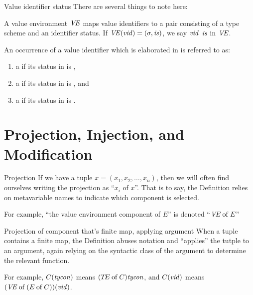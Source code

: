 \begin{definition}{Value identifier status}
There are several things to note here:

A value environment $\textit{V\kern-.05emE\/}$ maps value identifiers to a pair
consisting of a type scheme and an identifier status.
If $\textit{V\kern-.05emE\/}(\textit{vid\/})=(\sigma,\textit{is\/})$, we say $\textit{vid\/}$ 
$\textit{is\/}$ in $\textit{V\kern-.05emE\/}$.

An occurrence of a value identifier which is elaborated in \VE{} is
referred to as:
\begin{enumerate}
\item a  if its status in \VE{} is \isv,
\item a  if its status in \VE{} is \isc, and
\item a  if its status in \VE{} is \ise.
\end{enumerate}
\end{definition}

\section{Projection, Injection, and Modification}

\begin{definition}{Projection}
If we have a tuple $x=(x_{1},x_{2},\dots,x_{n})$, then we will often
find ourselves writing the projection as ``$x_{i}$ of $x$''. That is to
say, the Definition relies on metavariable names to indicate which
component is selected.

For example, ``the value environment component of $E$'' is denoted
``$\textit{V\kern-.05emE\/} \mathbin{\rm of} E$''
\end{definition}

\begin{convention}{Projection of component that's finite map, applying argument}
When a tuple contains a finite map, the Definition abuses notation and
``applies'' the tutple to an argument, again relying on the syntactic
class of the argument to determine the relevant function.

For example, $C(\textit{tycon\/})$ means $(\mbox{$T\!E$} \mathbin{\rm of} C)\textit{tycon\/}$,
and $C(\textit{vid\/})$ means $(\textit{V\kern-.05emE\/} \mathbin{\rm of} (E \mathbin{\rm of} C))(\textit{vid\/})$.
\end{convention}

